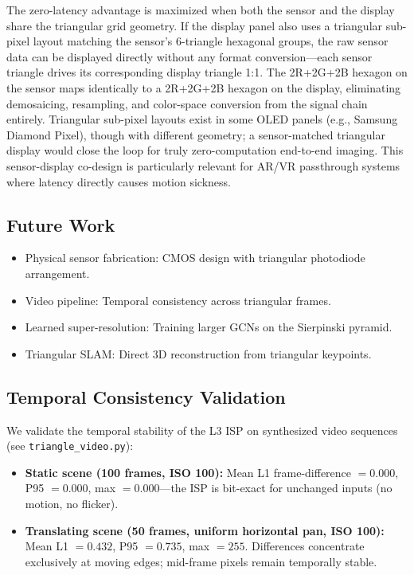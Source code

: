 \documentclass[10pt,twocolumn,letterpaper]{article}
\begin{document}
The zero-latency advantage is maximized when both the sensor and the display share the triangular grid geometry. If the display panel also uses a triangular sub-pixel layout matching the sensor's 6-triangle hexagonal groups, the raw sensor data can be displayed directly without any format conversion---each sensor triangle drives its corresponding display triangle 1:1. The 2R+2G+2B hexagon on the sensor maps identically to a 2R+2G+2B hexagon on the display, eliminating demosaicing, resampling, and color-space conversion from the signal chain entirely. Triangular sub-pixel layouts exist in some OLED panels (e.g., Samsung Diamond Pixel), though with different geometry; a sensor-matched triangular display would close the loop for truly zero-computation end-to-end imaging. This sensor-display co-design is particularly relevant for AR/VR passthrough systems where latency directly causes motion sickness.

\subsection{Future Work}

\begin{itemize}[nosep]
\item Physical sensor fabrication: CMOS design with triangular photodiode arrangement.
\item Video pipeline: Temporal consistency across triangular frames.
\item Learned super-resolution: Training larger GCNs on the Sierpinski pyramid.
\item Triangular SLAM: Direct 3D reconstruction from triangular keypoints.
\end{itemize}

\subsection{Temporal Consistency Validation}
We validate the temporal stability of the L3 ISP on synthesized video sequences (see \texttt{triangle\_video.py}):

\begin{itemize}[nosep]
\item \textbf{Static scene (100 frames, ISO 100):} Mean L1 frame-difference $= 0.000$, P95 $= 0.000$, max $= 0.000$---the ISP is bit-exact for unchanged inputs (no motion, no flicker).
\item \textbf{Translating scene (50 frames, uniform horizontal pan, ISO 100):} Mean L1 $= 0.432$, P95 $= 0.735$, max $= 255$. Differences concentrate exclusively at moving edges; mid-frame pixels remain temporally stable.
\end{itemize}
\end{document}
